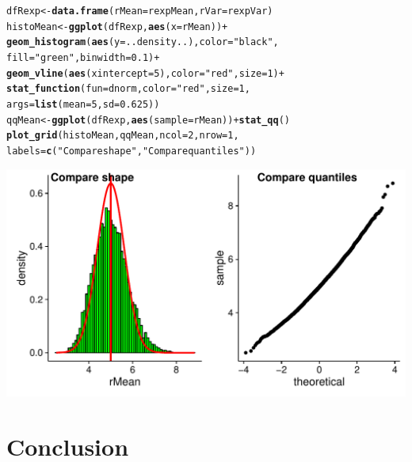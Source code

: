 \documentclass[a4paper, 11pt]{article}\usepackage[]{graphicx}\usepackage[]{color}
\makeatletter
\def\maxwidth{ %
  \ifdim\Gin@nat@width>\linewidth
    \linewidth
  \else
    \Gin@nat@width
  \fi
}
\newcommand{\hlnum}[1]{\textcolor[rgb]{0.686,0.059,0.569}{#1}}%
\newcommand{\hlstr}[1]{\textcolor[rgb]{0.192,0.494,0.8}{#1}}%
\newcommand{\hlopt}[1]{\textcolor[rgb]{0,0,0}{#1}}%
\newcommand{\hlstd}[1]{\textcolor[rgb]{0.345,0.345,0.345}{#1}}%
\newcommand{\hlkwb}[1]{\textcolor[rgb]{0.69,0.353,0.396}{#1}}%
\newcommand{\hlkwc}[1]{\textcolor[rgb]{0.333,0.667,0.333}{#1}}%
\newcommand{\hlkwd}[1]{\textcolor[rgb]{0.737,0.353,0.396}{\textbf{#1}}}%
\newenvironment{kframe}{%
 \def\at@end@of@kframe{}%
 \ifinner\ifhmode%
  \def\at@end@of@kframe{\end{minipage}}%
  \begin{minipage}{\columnwidth}%
 \fi\fi%
 \def\FrameCommand##1{\hskip\@totalleftmargin \hskip-\fboxsep
 \colorbox{shadecolor}{##1}\hskip-\fboxsep
     \hskip-\linewidth \hskip-\@totalleftmargin \hskip\columnwidth}%
 \MakeFramed {\advance\hsize-\width
   \@totalleftmargin\z@ \linewidth\hsize
   \@setminipage}}%
 {\par\unskip\endMakeFramed%
 \at@end@of@kframe}
\newenvironment{knitrout}{}{} %
\makeatother
\begin{document}
\begin{knitrout}\small
{}\color{fgcolor}\begin{kframe}
\begin{alltt}
\hlstd{dfRexp}  \hlkwb{<-} \hlkwd{data.frame}\hlstd{(}\hlkwc{rMean}\hlstd{=rexpMean,} \hlkwc{rVar}\hlstd{=rexpVar)}
\hlstd{histoMean} \hlkwb{<-} \hlkwd{ggplot}\hlstd{(dfRexp,} \hlkwd{aes}\hlstd{(}\hlkwc{x}\hlstd{=rMean))} \hlopt{+}
    \hlkwd{geom_histogram}\hlstd{(}\hlkwd{aes}\hlstd{(}\hlkwc{y}\hlstd{=..density..),} \hlkwc{color}\hlstd{=}\hlstr{"black"}\hlstd{,}
                   \hlkwc{fill}\hlstd{=}\hlstr{"green"}\hlstd{,} \hlkwc{binwidth}\hlstd{=}\hlnum{0.1}\hlstd{)} \hlopt{+}
    \hlkwd{geom_vline}\hlstd{(}\hlkwd{aes}\hlstd{(}\hlkwc{xintercept}\hlstd{=}\hlnum{5}\hlstd{),} \hlkwc{color}\hlstd{=}\hlstr{"red"}\hlstd{,} \hlkwc{size}\hlstd{=}\hlnum{1}\hlstd{)} \hlopt{+}
    \hlkwd{stat_function}\hlstd{(}\hlkwc{fun}\hlstd{=dnorm,} \hlkwc{color}\hlstd{=}\hlstr{"red"}\hlstd{,} \hlkwc{size}\hlstd{=}\hlnum{1}\hlstd{,}
                  \hlkwc{args}\hlstd{=}\hlkwd{list}\hlstd{(}\hlkwc{mean}\hlstd{=}\hlnum{5}\hlstd{,} \hlkwc{sd}\hlstd{=}\hlnum{0.625}\hlstd{))}
\hlstd{qqMean} \hlkwb{<-} \hlkwd{ggplot}\hlstd{(dfRexp,} \hlkwd{aes}\hlstd{(}\hlkwc{sample}\hlstd{=rMean))} \hlopt{+} \hlkwd{stat_qq}\hlstd{()}
\hlkwd{plot_grid}\hlstd{(histoMean, qqMean,} \hlkwc{ncol}\hlstd{=}\hlnum{2}\hlstd{,} \hlkwc{nrow}\hlstd{=}\hlnum{1}\hlstd{,}
          \hlkwc{labels}\hlstd{=}\hlkwd{c}\hlstd{(}\hlstr{"Compare shape"}\hlstd{,}\hlstr{"Compare quantiles"}\hlstd{))}
\end{alltt}
\end{kframe}
\includegraphics[width=\maxwidth]{figure/plots-1} 

\end{knitrout}
\section{Conclusion}

\end{document}
